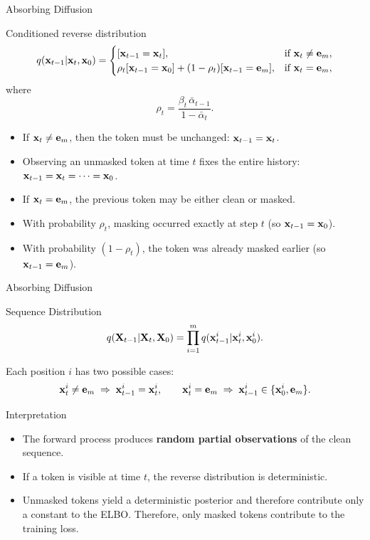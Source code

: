 \documentclass{beamer}
\begin{document}
\begin{frame}{Absorbing Diffusion}
	\begin{block}{Conditioned reverse distribution}
		\vspace{-0.5cm}
		\[
			q(\mathbf{x}_{t-1} | \mathbf{x}_t, \mathbf{x}_0) =
			\begin{cases}
				[\mathbf{x}_{t-1} = \mathbf{x}_t], 
				& \text{if } \mathbf{x}_t \neq \mathbf{e}_m, \\
				\rho_t[\mathbf{x}_{t-1} = \mathbf{x}_0] + (1-\rho_t)[\mathbf{x}_{t-1} = \mathbf{e}_m], 
				& \text{if } \mathbf{x}_t = \mathbf{e}_m,
			\end{cases}
		\]
		where
		\[
		\rho_t = \frac{\beta_t\,\bar\alpha_{t-1}}{1-\bar\alpha_t}.
		\]
	\end{block}
	\eqpause
	\begin{itemize}
		\item If $\mathbf{x}_t \neq \mathbf{e}_m$, then the token must be unchanged:
		$\mathbf{x}_{t-1} = \mathbf{x}_t$.
		\item Observing an unmasked token at time $t$ fixes the entire history:
		$\mathbf{x}_{t-1} = \mathbf{x}_t = \cdots = \mathbf{x}_0$.
		\eqpause
		\item If $\mathbf{x}_t = \mathbf{e}_m$, the previous token may be either clean or masked.
		\item With probability $\rho_t$, masking occurred exactly at step $t$
		(so $\mathbf{x}_{t-1} = \mathbf{x}_0$).
        \item With probability $(1 - \rho_t)$, the token was already masked earlier
		(so $\mathbf{x}_{t-1} = \mathbf{e}_m$).
	\end{itemize}
\end{frame}
\begin{frame}{Absorbing Diffusion}
    \begin{block}{Sequence Distribution}
        \vspace{-0.3cm}
        \[
            q(\mathbf{X}_{t-1} | \mathbf{X}_t,\mathbf{X}_0)
            =
            \prod_{i=1}^m q(\mathbf{x}_{t-1}^i | \mathbf{x}_t^i, \mathbf{x}_0^i).
        \]
    \end{block}
	Each position $i$ has two possible cases:
	\[
		\mathbf{x}_t^i \neq \mathbf{e}_m
		\;\Rightarrow\;
		\mathbf{x}_{t-1}^i = \mathbf{x}_t^i,
		\qquad
		\mathbf{x}_t^i = \mathbf{e}_m
		\;\Rightarrow\;
		\mathbf{x}_{t-1}^i \in \{\mathbf{x}_0^i, \mathbf{e}_m\}.
	\]
    \vspace{-0.5cm}
    \eqpause
    \begin{block}{Interpretation}
        \begin{itemize}
            \item The forward process produces \textbf{random partial observations} of the clean sequence.
            \item If a token is visible at time $t$, the reverse distribution is deterministic.
            \item Unmasked tokens yield a deterministic posterior and therefore contribute only a constant to the ELBO. Therefore, only masked tokens contribute to the training loss.
        \end{itemize}
    \end{block}
\end{frame}
\end{document}
